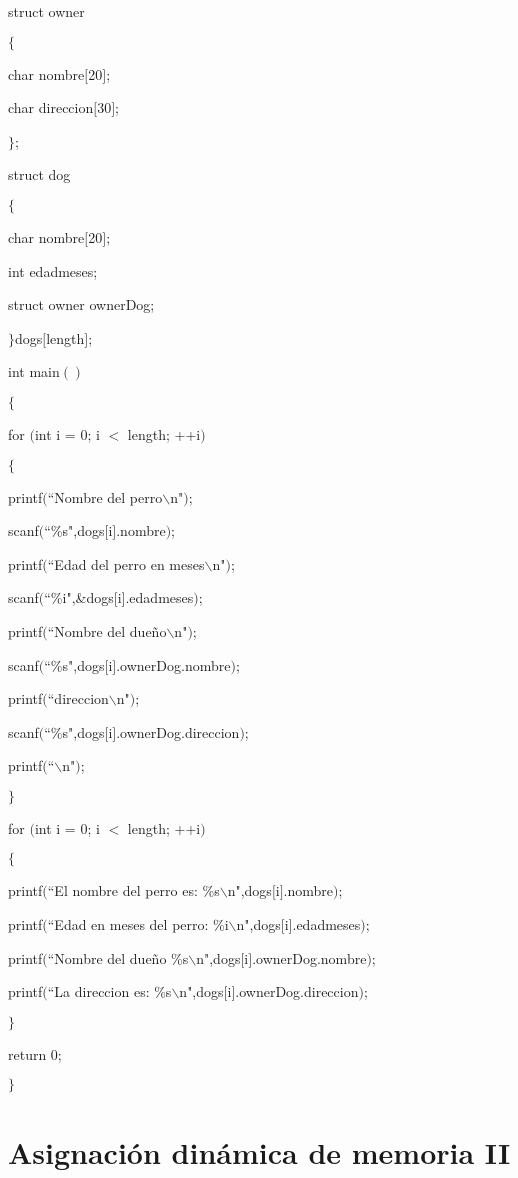 \documentclass[]{article}
\begin{document}
	struct owner
	
	$\lbrace$
	
	char nombre$[$20$]$;
	
	char direccion$[$30$]$;
	
	$\rbrace$;
	
	struct dog
	
	$\lbrace$
	
	char nombre$[$20$]$;
	
	int edadmeses;
	
	struct owner ownerDog;
	
	$\rbrace$dogs$[$length$]$;
	
	int main$()$
	
	$\lbrace$
	
	for $($int i = 0; i $<$ length; ++i$)$
	
	$\lbrace$
	
	printf$($``Nombre del perro$\backslash$n"$)$;
	
	scanf$($``\%s",dogs$[$i$]$.nombre$)$;
	
	printf$($``Edad del perro en meses$\backslash$n"$)$;
	
	scanf$($``\%i",\&dogs$[$i$]$.edadmeses$)$;
	
	printf$($``Nombre del dueño$\backslash$n"$)$;
	
	scanf$($``\%s",dogs$[$i$]$.ownerDog.nombre$)$;
	
	printf$($``direccion$\backslash$n"$)$;
	
	scanf$($``\%s",dogs$[$i$]$.ownerDog.direccion$)$;
	
	printf$($``$\backslash$n"$)$;
	
	$\rbrace$
	
	for $($int i = 0; i $<$ length; ++i$)$
	
	$\lbrace$
	
	printf$($``El nombre del perro es: \%s$\backslash$n",dogs$[$i$]$.nombre$)$;
	
	printf$($``Edad en meses del perro: \%i$\backslash$n",dogs$[$i$]$.edadmeses$)$;
	
	printf$($``Nombre del dueño \%s$\backslash$n",dogs$[$i$]$.ownerDog.nombre$)$;
	
	printf$($``La direccion es: \%s$\backslash$n",dogs$[$i$]$.ownerDog.direccion$)$;
	
	$\rbrace$
	
	return 0;
	
	$\rbrace$
	
	\section{Asignación dinámica de memoria II}
	
\end{document}
